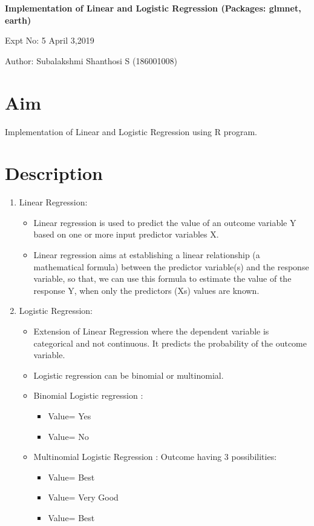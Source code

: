 \documentclass[a4paper,10pt]{article}
\begin{document}
\setcounter{secnumdepth}{-1} 

\begin{center}
\textbf{\LARGE  Implementation of Linear and Logistic Regression (Packages: glmnet, earth)}
\end{center}

\raggedright Expt No: 5 \hfill \raggedleft April 3,2019 \\ 

\raggedright Author: Subalakshmi Shanthosi S (186001008) \par 

\noindent\makebox[\linewidth]{\rule{\textwidth}{1pt}} 

\section{Aim}
Implementation of Linear and Logistic Regression using R program.

\section{Description}
\begin{enumerate}
	\item Linear Regression:
	\begin{itemize}
		\item Linear regression is used to predict the value of an outcome variable Y based on one or more input predictor variables X.
		\item Linear regression aims at establishing a linear relationship (a mathematical formula) between the predictor variable(s) and the response variable, so that, we can use this formula to estimate the value of the response Y, when only the predictors (Xs) values are known.	 	
	\end{itemize}
	\item Logistic Regression:

	\begin{itemize}
		\item Extension of Linear Regression where the dependent variable is categorical and not continuous. It predicts the probability of the outcome variable.
		\item Logistic regression can be binomial or multinomial.
		\item Binomial Logistic regression : 
		  \begin{itemize}
		  	\item Value= Yes
		  	\item Value= No
		  \end{itemize}
		\item Multinomial Logistic Regression : Outcome having 3 possibilities:
		\begin{itemize}
	         \item Value= Best
	         \item Value= Very Good
	         \item Value= Best
		\end{itemize}
	\end{itemize}

\end{enumerate}
\end{document}
